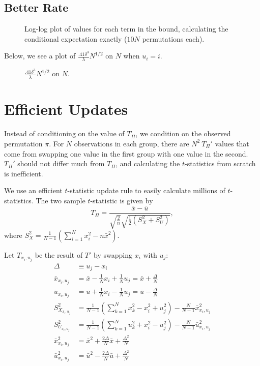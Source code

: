 \subsection{Better Rate}
\begin{figure}[!ht]
  \centering
  
  \caption{Log-log plot of values for each term in the bound, calculating the conditional
    expectation exactly ($10N$ permutations each).}
\end{figure}
\clearpage

Below, we see a plot of $\frac{.41 \delta^3}{\lambda}N^{1/2}$ on $N$
when $u_i = i$.
\begin{figure}[!ht]
  \centering
  
  \caption{$\frac{.41 \delta^3}{\lambda}N^{1/2}$ on $N$.}
\end{figure}

\section{Efficient Updates}
Instead of conditioning on the value of $T_{\Pi}$, we condition on the
observed permutation $\pi$.  For $N$ observations in each group, there
are $N^2 \: T_{\Pi}'$ values that come from swapping one value in the first
group with one value in the second.  $T_{\Pi}'$ should not differ much from
$T_{\Pi}$, and calculating the $t$-statistics from scratch is inefficient.

We use an efficient $t$-statistic update rule to easily calculate
millions of $t$-statistics.  The two sample $t$-statistic is given by
\begin{equation*}
  T_{\Pi} = \frac{\bar{x}-\bar{u}}
  {\sqrt{\frac{2}{n}}\sqrt{\frac{1}{2}(S_X^2+S_U^2)}},
\end{equation*}
where $S_X^2=\frac{1}{N-1}(\sum_{i=1}^Nx_i^2-n\bar{x}^2)$.

Let $T_{x_i,u_j}$ be the result of $T'$ by swapping $x_i$ with $u_j$:
\begin{align*}
  \Delta &\equiv u_j-x_i \\
  \bar{x}_{x_i,u_j} &= \bar{x}-\frac{1}{N}x_i+\frac{1}{N}u_j =
  \bar{x}+\frac{\Delta}{N} \\
  \bar{u}_{x_i,u_j} &= \bar{u}+\frac{1}{N}x_i-\frac{1}{N}u_j =
  \bar{u}-\frac{\Delta}{N} \\
  S_{X_{x_i,u_j}}^2 &= \frac{1}{N-1}(\sum_{k=1}^N x_k^2 - x_i^2 +
  u_j^2) - \frac{N}{N-1}\bar{x}^2_{x_i,u_j} \\
  S_{U_{x_i,u_j}}^2 &= \frac{1}{N-1}(\sum_{k=1}^N u_k^2 + x_i^2 -
  u_j^2) - \frac{N}{N-1}\bar{u}^2_{x_i,u_j} \\
  \bar{x}_{x_i,u_j}^2 &= \bar{x}^2 + \frac{2\Delta}{N}\bar{x} +
  \frac{\Delta^2}{N} \\
  \bar{u}_{x_i,u_j}^2 &= \bar{u}^2 - \frac{2\Delta}{N}\bar{u} + \frac{\Delta^2}{N}
\end{align*}


